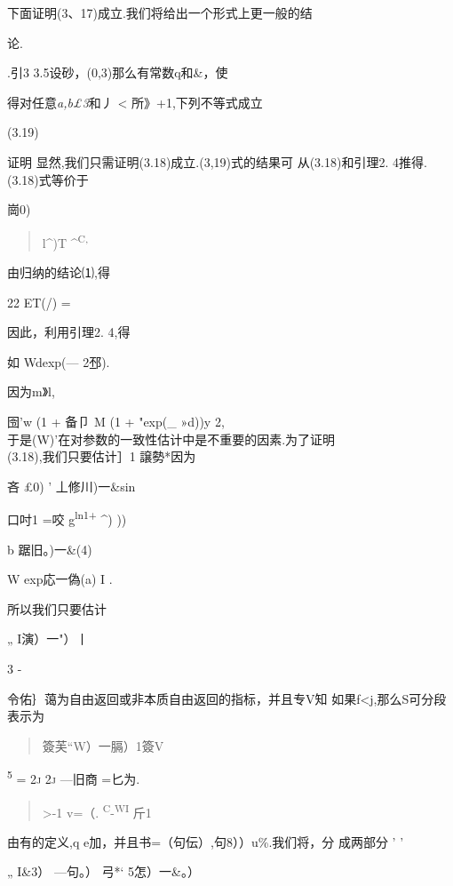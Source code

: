 \documentclass{article}
\begin{document}
下面证明(3、17)成立.我们将给出一个形式上更一般的结

论.

.引3 3.5设砂，(0,3)那么有常数q和\&，使

得对任意\emph{a,b£3}和丿 \textless{} 所》+1,下列不等式成立

(3.19)

证明 显然,我们只需证明(3.18)成立.(3,19)式的结果可 从(3.18)和引理2.
4推得.(3.18)式等价于

崗0)\textbar{}

\begin{quote}
l\^{})T \^{}\textsuperscript{C,}
\end{quote}

由归纳的结论⑴,得

22 \textbar{}ET(/)\textbar{} =

因此，利用引理2. 4,得

\textbar{}如 Wdexp(--- 2邳).

因为m》l,

囹'w (1 + 备卩 M (1 + "exp(\_ »d))y 2,\\
于是(W)'在对参数的一致性估计中是不重要的因素.为了证明\\
(3.18),我们只要估计］1 譲勢*因为

吝 \textbar{}£0)\textbar{} ' 丄修川)一\&sin

口吋1 =咬 g\textsuperscript{ln}\textbar{}\textsuperscript{1+}
\textbar{}\^{})\textbar{} ))

b 踞旧。)一\&(4)\textbar{}

W exp応一偽(a) I .

所以我们只要估计

„ I演）一"）丨

3 -

令佑｝蔼为自由返回或非本质自由返回的指标，并且专V知
如果f\textless{}j,那么S可分段表示为

\begin{quote}
簽芙``W）一膈）1簽V
\end{quote}

\textsc{\textsuperscript{5} = 2j 2j} ---旧商 =匕为.

\begin{quote}
\textgreater{}-1 v=（.
\textsuperscript{\textbar{}C}-\textsuperscript{WI} 斤1
\end{quote}

由有的定义,q e加，并且书=（句伝）,句8））u\%.我们将，分 成两部分 ' '

„ I\&3） ---句。）\textbar{} 弓*` \textbar{}5怎）一\&。）\textbar{}
\end{document}
